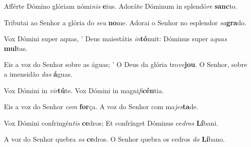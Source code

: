 \begin{greenumerate}
  \setcounter{enumi}{1}


  \item Afférte Dómino glóriam nómi\textit{nis} \textbf{e}ius.  {\GreStar} Adoráte Dóminum in splendó\textit{re} \textbf{sanc}to. 

  \switchcolumn\setcounter{enumi}{1}

  \item Tributai ao Senhor a glória do \textit{seu} \textbf{no}me.  {\GreStar} Adorai o Senhor no esplendor \textit{sa}\textbf{gra}do. 

  \switchcolumn*


  \item Vox Dómini super aquas, {\large'} Deus maiestátis \textit{in}\textbf{tó}nuit:  {\GreStar} Dóminus super a\textit{quas} \textbf{mul}tas. 

  \switchcolumn%

  \item Eis a voz do Senhor sobre as águas; {\large'} O Deus da glória tro\textit{ve}\textbf{jou}.  {\GreStar} O Senhor, sobre a imensidão \textit{das} \textbf{á}guas. 

  \switchcolumn*


  \item Vox Dómini in \textit{vir}\textbf{tú}te.  {\GreStar} Vox Dómini in magni\textit{fi}\textbf{cén}tia. 

  \switchcolumn%

  \item Eis a voz do Senhor \textit{com} \textbf{for}ça.  {\GreStar} A voz do Senhor com ma\textit{jes}\textbf{ta}de. 

  \switchcolumn*


  \item Vox Dómini confringén\textit{tis} \textbf{ce}dros;  {\GreStar} Et confrínget Dóminus ce\textit{dros} \textbf{Lí}bani. 

  \switchcolumn%

  \item A voz do Senhor quebra \textit{os} \textbf{ce}dros.  {\GreStar} O Senhor quebra os cedros \textit{do} \textbf{Lí}bano. 


\end{greenumerate}
